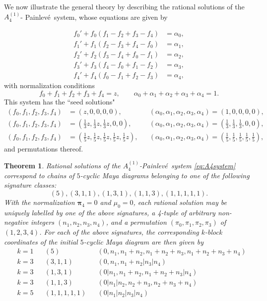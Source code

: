 \documentclass[10pt]{amsart}
\newtheorem{thm}{Theorem}[section]
\theoremstyle{definition}
\numberwithin{equation}{section}
\numberwithin{figure}{section}
\newcommand{\bpi}{{\boldsymbol{\pi}}}
\newcommand{\p}{Painlev\'{e}}
\renewcommand{\a}{\alpha}
\begin{document}

We now illustrate the general theory by describing the rational
solutions of the $A^{(1)}_4$- \p\ system, whose equations are given by

\begin{align}\label{eq:A4system}
f_0' + f_0(f_1-f_2+f_3-f_4) &= \a_0, \nonumber\\
f_1' + f_1(f_2-f_3+f_4-f_0) &= \a_1,\nonumber \\
f_2' + f_2(f_3-f_4+f_0-f_1) &= \a_2, \\
f_3' + f_3(f_4-f_0+f_1-f_2) &= \a_3, \nonumber \\
f_4' + f_4(f_0-f_1+f_2-f_3) &= \a_4,\nonumber 
\end{align}
with normalization conditions
\[ f_0+f_1+f_2+f_3+f_4=z,\qquad \a_0+\a_1+\a_2+\a_3+\a_4=1.\]
This system has the ``seed solutions"
\begin{align*}
(f_0,f_1,f_2,f_3,f_4)&=(z,0,0,0,0), && (\a_0,\a_1,\a_2,\a_3,\a_4)=(1,0,0,0,0),\\
(f_0,f_1,f_2,f_3,f_4)&=(\tfrac13z,\tfrac13z,\tfrac13z,0,0), && (\a_0,\a_1,\a_2,\a_3,\a_4)=(\tfrac13,\tfrac13,\tfrac13,0,0),\\
(f_0,f_1,f_2,f_3,f_4)&=(\tfrac15z,\tfrac15z,\tfrac15z,\tfrac15z,\tfrac15z), && (\a_0,\a_1,\a_2,\a_3,\a_4)=(\tfrac15,\tfrac15,\tfrac15,\tfrac15,\tfrac15),
\end{align*}
and permutations thereof.
\begin{thm}\label{thm:A4}
  Rational solutions of the $A^{(1)}_4$-\p\ system \eqref{eq:A4system} correspond to chains of $5$-cyclic
  Maya diagrams belonging to one of the following signature classes:
  \[ (5), (3,1,1), (1,3,1), (1,1,3), (1,1,1,1,1).\]
  With the normalization $\bpi_4=0$ and $\mu_0=0$, each rational
  solution may be uniquely labelled by one of the above signatures,
  a 4-tuple of arbitrary non-negative integers $(n_1, n_2, n_3, n_4)$, and  a
  permutation $(\pi_0, \pi_1,\pi_2, \pi_3)$ of $(1,2,3,4)$.  For
  each of the above signatures, the corresponding $k$-block coordinates
  of the initial $5$-cyclic Maya diagram are then given by
  \begin{align*}
&k=1 & &(5)& &(0,n_1,n_1+n_2, n_1+n_2+n_3, n_1+n_2+n_3+n_4) \\
&k=3 & &(3,1,1) && (0, n_1 , n_1+ n_2 | n_3 | n_4)\\
&k=3 & &(1,3,1) & &(0| n_1, n_1+n_2, n_1+n_2+n_3 | n_4)\\
&k=3 & &(1,1,3) & &(0| n_1 | n_2, n_2+n_3, n_2+n_3+n_4 )\\
&k=5 & &(1,1,1,1,1) && (0| n_1 | n_2| n_3| n_4)\\
  \end{align*}
\end{thm}
\end{document}
